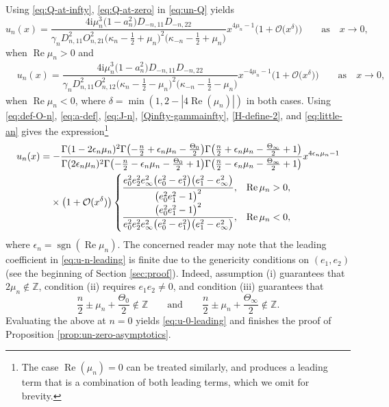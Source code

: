 \documentclass[pdftex]{sigma}
\numberwithin{equation}{section}
\newcommand{\ii}{\mathrm{i}}
\newcommand{\Z}{{\mathbb{Z}}}
\newcommand{\re}{\operatorname{Re}}
\newcommand{\sgn}{\operatorname{sgn}}
\begin{document}
Using \eqref{eq:Q-at-infty}, \eqref{eq:Q-at-zero} in \eqref{eq:un-Q} yields
\begin{equation*}
u_n(x) = \dfrac{4\ii \mu_n^3 \big(1-a_n^2\big)D_{-n, 11}D_{-n, 22}}{\gamma_n D_{n, 11}^2 O_{n, 21}^2 \big(\kappa_n-\tfrac{1}{2}+\mu_n\big)^2\big(\kappa_{-n}-\tfrac{1}{2}+\mu_n\big)} x^{4\mu_n - 1} \big(1 + \mathcal{O}\big(x^\delta\big) \big) \qquad \text{as} \quad x \to 0,
\end{equation*}
when $\re \mu_n > 0$ and
\begin{align*}
&u_n(x) = \dfrac{4\ii \mu_n^3 \big(1-a_n^2\big)D_{-n, 11}D_{-n, 22}}{\gamma_n D_{n, 11}^2 O_{n, 12}^2 \big(\kappa_n-\tfrac{1}{2}-\mu_n\big)^2\big(\kappa_{-n}-\tfrac{1}{2}-\mu_n\big)}x^{-4\mu_n - 1} \big(1 + \mathcal{O}\big(x^\delta\big) \big) \qquad \text{as} \quad x \to 0,
\end{align*}
when $\re \mu_n < 0$, where $\delta = \min(1, 2 - |4\re(\mu_n)| )$ in both cases. Using \eqref{eq:def-O-n}, \eqref{eq:a-def}, \eqref{eq:J-n}, \eqref{Qinfty-gammainfty}, \eqref{H-define-2}, and \eqref{eq:little-an} gives the expression\footnote{The case $\re(\mu_n) = 0$ can be treated similarly, and produces a leading term that is a combination of both leading terms, which we omit for brevity.}
 \begin{align}
& u_n(x) =
 -\frac{ \Gamma (1 - 2\epsilon_n \mu_n)^2 \Gamma \bigl(-\frac{n}{2} + \epsilon_n \mu_n -\frac{\Theta_0}{2}\bigr) \Gamma \big(\frac n2 + \epsilon_n \mu_n - \frac{\Theta_\infty}{2} + 1 \big)}{\Gamma (2\epsilon_n \mu_n )^2 \Gamma \bigl(-\frac{n}{2} - \epsilon_n \mu_n -\frac{\Theta_0}{2}+1\bigr) \Gamma \big(\frac{n}{2} - \epsilon_n \mu_n -\frac{\Theta_\infty }{2}+1\big)} x^{4 \epsilon_n \mu_n - 1} \nonumber\\
 &\hphantom{u_n(x) =}{}
 \times\big(1 + \mathcal{O}(x^\delta) \big)
 \begin{cases} \dfrac{e_0^2 e_2^2 e_\infty^2\big(e_0^2-e_1^2\big) \big(e_1^2-e_\infty^2\big)}{\big(e_0^2 e_1^2-1\big)^2} ,& \re \mu_n >0, \\ \dfrac{\big(e_0^2 e_1^2-1\big)^2}{e_0^2 e_2^2 e_\infty^2\big(e_0^2-e_1^2\big) \big(e_1^2-e_\infty^2\big)},& \re \mu_n < 0, \end{cases}
 \label{eq:u-n-leading}
 \end{align}
 where $\epsilon_n = \sgn(\re \mu_n)$.
The concerned reader may note that the leading coefficient in \eqref{eq:u-n-leading} is finite due to the genericity conditions on $(e_1, e_2)$ (see the beginning of Section \ref{sec:proof}). Indeed, assumption (i) guarantees that $2\mu_n \not \in \Z$, condition (ii) requires $e_1 e_2 \neq 0$, and condition (iii) guarantees that
\[
\dfrac{n}{2} \pm \mu_n + \dfrac{\Theta_0}{2} \not \in \Z \qquad \text{and} \qquad \dfrac{n}{2} \pm \mu_n + \dfrac{\Theta_\infty}{2} \not \in \Z.
\]
Evaluating the above at $n =0$ yields \eqref{eq:u-0-leading} and finishes the proof of Proposition \ref{prop:un-zero-asymptotics}.
\end{document}
